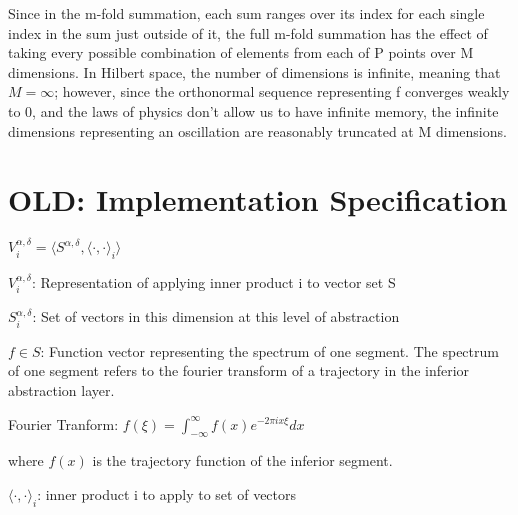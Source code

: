 \documentclass{article}
\begin{document}
Since in the m-fold summation, each sum ranges over its index for each single index in the sum just outside of it, the full m-fold summation has the effect of taking every possible combination of elements from each of P points over M dimensions.  In Hilbert space, the number of dimensions is infinite, meaning that $M = \infty$; however, since the orthonormal sequence representing f converges weakly to 0, and the laws of physics don't allow us to have infinite memory, the infinite dimensions representing an oscillation are reasonably truncated at M dimensions.

\section{OLD: Implementation Specification}

$V_i^{\alpha , \delta} = \langle S^{\alpha, \delta}, \langle \cdot , \cdot \rangle_i \rangle$

$V_i^{\alpha , \delta}$: Representation of applying inner product i to vector set S

$S_i^{\alpha , \delta}$: Set of vectors in this dimension at this level of abstraction

$f \in S$: Function vector representing the spectrum of one segment.
The spectrum of one segment refers to the fourier transform of a trajectory in the inferior abstraction layer.

Fourier Tranform: $f(\xi) = \int_{-\infty}^\infty f(x) e^{-2 \pi i x \xi} dx$

where $f(x)$ is the trajectory function of the inferior segment.

$\langle \cdot , \cdot \rangle_i$: inner product i to apply to set of vectors
\end{document}
